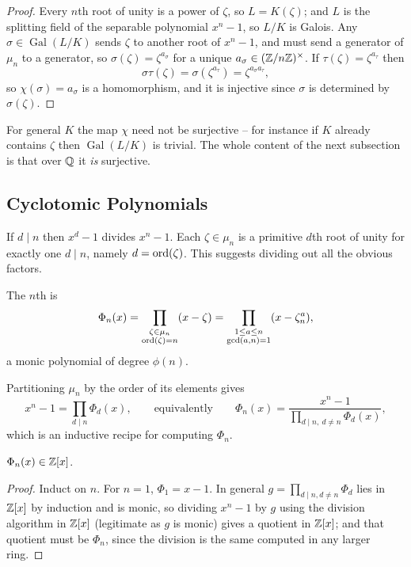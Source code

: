 \documentclass[a4paper]{scrartcl}
\newcommand{\Gal}{\operatorname{Gal}}
\begin{document}
\begin{proof}
	Every $n$th root of unity is a power of $\zeta$, so $L = K(\zeta)$; and $L$ is the splitting field of the separable polynomial $x^n-1$, so $L/K$ is Galois. Any $\sigma \in \Gal(L/K)$ sends $\zeta$ to another root of $x^n-1$, and must send a generator of $\mu_n$ to a generator, so $\sigma(\zeta) = \zeta^{a_\sigma}$ for a unique $a_\sigma \in (\mathbb{Z}/n\mathbb{Z})^\times$. If $\tau(\zeta) = \zeta^{a_\tau}$ then
	$$\sigma\tau(\zeta) = \sigma(\zeta^{a_\tau}) = \zeta^{a_\sigma a_\tau},$$
	so $\chi(\sigma) = a_\sigma$ is a homomorphism, and it is injective since $\sigma$ is determined by $\sigma(\zeta)$.
\end{proof}

For general $K$ the map $\chi$ need not be surjective -- for instance if $K$ already contains $\zeta$ then $\Gal(L/K)$ is trivial. The whole content of the next subsection is that over $\mathbb{Q}$ it \emph{is} surjective.

\subsection{Cyclotomic Polynomials}

If $d \mid n$ then $x^d - 1$ divides $x^n-1$. Each $\zeta \in \mu_n$ is a primitive $d$th root of unity for exactly one $d \mid n$, namely $d = \operatorname{ord}(\zeta)$. This suggests dividing out all the obvious factors.

\begin{definition}
	The $n$th  is
	$$\Phi_n(x) = \prod_{\substack{\zeta \in \mu_n \\ \operatorname{ord}(\zeta) = n}} (x - \zeta) = \prod_{\substack{1 \leq a \leq n\\ \gcd(a,n)=1}}(x - \zeta_n^a),$$
	a monic polynomial of degree $\phi(n)$.
\end{definition}

Partitioning $\mu_n$ by the order of its elements gives
$$x^n - 1 = \prod_{d \mid n}\Phi_d(x), \qquad\text{equivalently}\qquad \Phi_n(x) = \frac{x^n-1}{\prod_{d\mid n,\ d\neq n}\Phi_d(x)},$$
which is an inductive recipe for computing $\Phi_n$.

\begin{proposition}
	$\Phi_n(x) \in \mathbb{Z}[x]$.
\end{proposition}

\begin{proof}
	Induct on $n$. For $n=1$, $\Phi_1 = x-1$. In general $g = \prod_{d\mid n, d\neq n}\Phi_d$ lies in $\mathbb{Z}[x]$ by induction and is monic, so dividing $x^n-1$ by $g$ using the division algorithm in $\mathbb{Z}[x]$ (legitimate as $g$ is monic) gives a quotient in $\mathbb{Z}[x]$; and that quotient must be $\Phi_n$, since the division is the same computed in any larger ring.
\end{proof}
\end{document}
